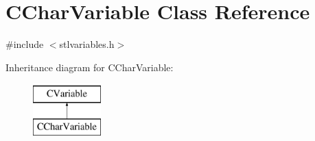 \hypertarget{classCCharVariable}{\section{C\-Char\-Variable Class Reference}
\label{classCCharVariable}
}


{\ttfamily \#include $<$stlvariables.\-h$>$}

Inheritance diagram for C\-Char\-Variable\-:\begin{figure}[H]
\begin{center}
\leavevmode
\includegraphics[height=2.000000cm]{d3/daa/classCCharVariable}
\end{center}
\end{figure}
